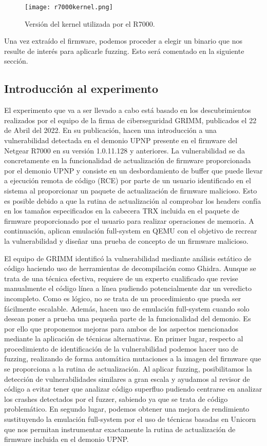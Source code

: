 \begin{figure}[H]
    \centering
    \texttt{[image: r7000kernel.png]}
    \caption{Versión del kernel utilizada por el R7000.}
    \label{fig:R7000kernel}
\end{figure}

Una vez extraído el firmware, podemos proceder a elegir un binario que nos resulte de interés para aplicarle fuzzing. Esto será
comentado en la siguiente sección.

\subsection{Introducción al experimento}
El experimento que va a ser llevado a cabo está basado en los descubrimientos realizados por el equipo de la firma de ciberseguridad GRIMM, publicados el
22 de Abril del 2022\cite{r7000GRIMM}. En su publicación, hacen una introducción a una vulnerabilidad detectada en el demonio UPNP presente en 
el firmware del Netgear R7000 en su versión 1.0.11.128 y anteriores. La vulnerabilidad se da concretamente en la funcionalidad de actualización de 
firmware proporcionada por el demonio UPNP y consiste en un desbordamiento de buffer que puede llevar a ejecución remota de código (RCE) por parte de un usuario 
identificado en el sistema al proporcionar un paquete de actualización de firmware malicioso. Esto es posible debido a que la rutina de actualización 
al comprobar los headers confía en los tamaños especificados en la cabecera TRX\cite{firmwareFormat} incluida en el paquete de firmware proporcionado 
por el usuario para realizar operaciones de memoria. A continuación, aplican emulación full-system en QEMU con el objetivo de recrear la vulnerabilidad 
y diseñar una prueba de concepto de un firmware malicioso.\bigskip

El equipo de GRIMM identificó la vulnerabilidad mediante análisis estático de código haciendo uso de herramientas de decompilación como Ghidra\cite{Ghidra}.
Aunque se trata de una técnica efectiva, requiere de un experto cualificado que revise manualmente el código línea a línea pudiendo potencialmente dar un veredicto incompleto. Como es lógico, no se trata de un procedimiento que pueda ser fácilmente escalable. Además, hacen uso de emulación full-system cuando solo desean
poner a prueba una pequeña parte de la funcionalidad del demonio. Es por ello que proponemos mejoras para ambos de los aspectos mencionados mediante la aplicación 
de técnicas alternativas. En primer lugar, respecto al procedimiento de identificación de la vulnerabilidad podemos hacer uso de fuzzing, realizando de forma 
automática mutaciones a la imagen del firmware que se proporciona a la rutina de actualización. Al aplicar fuzzing, posibilitamos la detección de vulnerabilidades 
similares a gran escala y ayudamos al revisor de código a evitar tener que analizar código superfluo pudiendo centrarse en analizar los crashes detectados por
el fuzzer, sabiendo ya que se trata de código problemático. En segundo lugar, podemos obtener una mejora de rendimiento sustituyendo la emulación full-system 
por el uso de técnicas basadas en Unicorn\cite{unicorn} que nos permitan instrumentar exactamente la rutina de actualización de firmware incluida en el 
demonio UPNP.\bigskip

